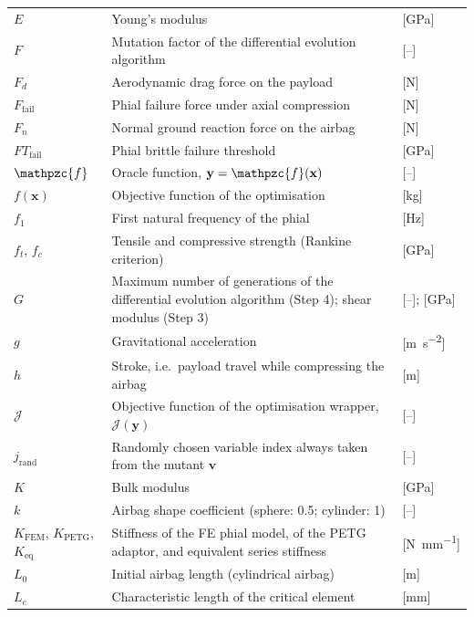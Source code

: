 {\begin{longtable}{L{0.16} L{0.64} L{0.20}}
$E$ & Young's modulus & [GPa] \\
$F$ & Mutation factor of the differential evolution algorithm & [--] \\
$F_d$ & Aerodynamic drag force on the payload & [\si{\newton}] \\
$F_\text{fail}$ & Phial failure force under axial compression & [\si{\newton}] \\
$F_n$ & Normal ground reaction force on the airbag & [\si{\newton}] \\
$FT_\text{fail}$ & Phial brittle failure threshold & [GPa] \\
$\mathpzc{f}$ & Oracle function, $\mathbf{y} = \mathpzc{f}(\mathbf{x})$ & [--] \\
$f(\mathbf{x})$ & Objective function of the optimisation & [\si{\kilogram}] \\
$f_1$ & First natural frequency of the phial & [\si{\hertz}] \\
$f_t$, $f_c$ & Tensile and compressive strength (Rankine criterion) & [GPa] \\
$G$ & Maximum number of generations of the differential evolution algorithm (Step 4); shear modulus (Step 3) & [--]; [GPa] \\
$g$ & Gravitational acceleration & [\si{\metre\per\second\squared}] \\
$h$ & Stroke, i.e.\ payload travel while compressing the airbag & [\si{\metre}] \\
$\mathcal{J}$ & Objective function of the optimisation wrapper, $\mathcal{J}(\mathbf{y})$ & [--] \\
$j_\text{rand}$ & Randomly chosen variable index always taken from the mutant $\mathbf{v}$ & [--] \\
$K$ & Bulk modulus & [GPa] \\
$k$ & Airbag shape coefficient (sphere: 0.5; cylinder: 1) & [--] \\
$K_\text{FEM}$, $K_\text{PETG}$, $K_\text{eq}$ & Stiffness of the FE phial model, of the PETG adaptor, and equivalent series stiffness & [\si{\newton\per\milli\metre}] \\
$L_0$ & Initial airbag length (cylindrical airbag) & [\si{\metre}] \\
$L_e$ & Characteristic length of the critical element & [\si{\milli\metre}] \\

\end{longtable}}
